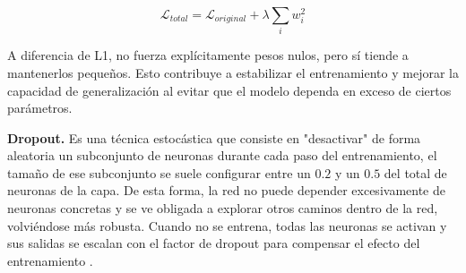\begin{equation}
	\mathcal{L}_{total} = \mathcal{L}_{original} + \lambda \sum_{i} w_i^2
	\label{eq:l2_reg}
\end{equation}

A diferencia de L1, no fuerza explícitamente pesos nulos, pero sí tiende a mantenerlos pequeños. Esto contribuye a estabilizar el entrenamiento y mejorar la capacidad de generalización al evitar que el modelo dependa en exceso de ciertos parámetros.

\textbf{Dropout.} Es una técnica estocástica que consiste en "desactivar" de forma aleatoria un subconjunto de neuronas durante cada paso del entrenamiento, el tamaño de ese subconjunto se suele configurar entre un $0.2$ y un $0.5$ del total de neuronas de la capa. De esta forma, la red no puede depender excesivamente de neuronas concretas y se ve obligada a explorar otros caminos dentro de la red, volviéndose más robusta. Cuando no se entrena, todas las neuronas se activan y sus salidas se escalan con el factor de dropout para compensar el efecto del entrenamiento \cite{dl_python__chollet_2021}.


